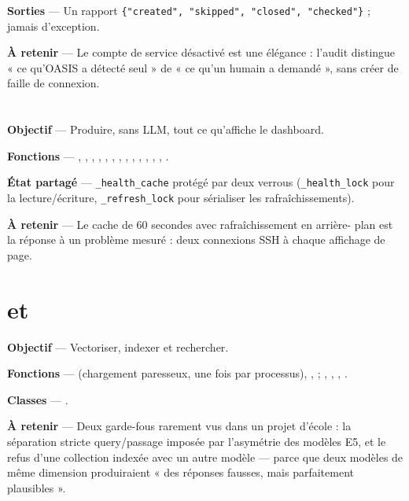 \textbf{Sorties} --- Un rapport
\texttt{\{"created", "skipped", "closed", "checked"\}} ; jamais d'exception.

\textbf{À retenir} --- Le compte de service désactivé est une élégance :
l'audit distingue « ce qu'OASIS a détecté seul » de « ce qu'un humain a
demandé », sans créer de faille de connexion.

\section{}

\textbf{Objectif} --- Produire, sans LLM, tout ce qu'affiche le dashboard.

\textbf{Fonctions} --- , ,
, , ,
, , ,
, ,
, , ,
.

\textbf{État partagé} --- \texttt{\_health\_cache} protégé par deux verrous
(\texttt{\_health\_lock} pour la lecture/écriture, \texttt{\_refresh\_lock} pour
sérialiser les rafraîchissements).

\textbf{À retenir} --- Le cache de 60 secondes avec rafraîchissement en arrière-
plan est la réponse à un problème mesuré : deux connexions SSH à chaque
affichage de page.

\section{ et }

\textbf{Objectif} --- Vectoriser, indexer et rechercher.

\textbf{Fonctions} ---  (chargement paresseux, une
fois par processus), ,  ;
, , ,
.

\textbf{Classes} --- .

\textbf{À retenir} --- Deux garde-fous rarement vus dans un projet d'école : la
séparation stricte query/passage imposée par l'asymétrie des modèles E5, et le
refus d'une collection indexée avec un autre modèle --- parce que deux modèles
de même dimension produiraient « des réponses fausses, mais parfaitement
plausibles ».

